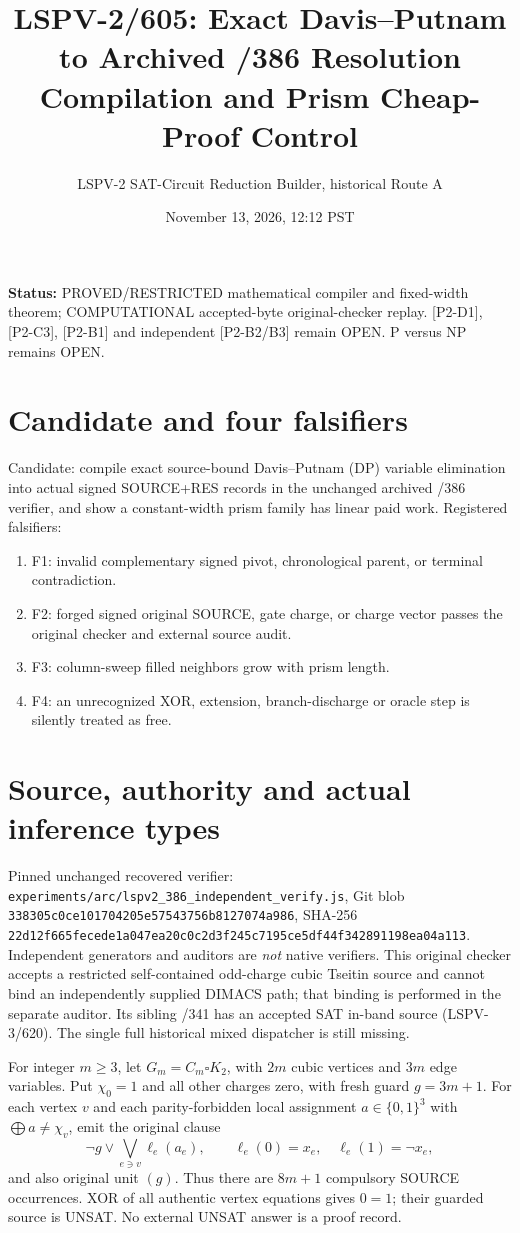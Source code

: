 \documentclass[11pt]{article}
\title{LSPV-2/605: Exact Davis--Putnam to Archived /386 Resolution Compilation and Prism Cheap-Proof Control}
\author{LSPV-2 SAT-Circuit Reduction Builder, historical Route A}
\date{November 13, 2026, 12:12 PST}
\begin{document}
\maketitle
\noindent\textbf{Status:} PROVED/RESTRICTED mathematical compiler and fixed-width theorem; COMPUTATIONAL accepted-byte original-checker replay. [P2-D1], [P2-C3], [P2-B1] and independent [P2-B2/B3] remain OPEN. P versus NP remains OPEN.

\section*{Candidate and four falsifiers}
Candidate: compile exact source-bound Davis--Putnam (DP) variable elimination into actual signed SOURCE+RES records in the unchanged archived /386 verifier, and show a constant-width prism family has linear paid work. Registered falsifiers:
\begin{enumerate}
\item[] F1: invalid complementary signed pivot, chronological parent, or terminal contradiction.
\item[] F2: forged signed original SOURCE, gate charge, or charge vector passes the original checker and external source audit.
\item[] F3: column-sweep filled neighbors grow with prism length.
\item[] F4: an unrecognized XOR, extension, branch-discharge or oracle step is silently treated as free.
\end{enumerate}

\section*{Source, authority and actual inference types}
Pinned unchanged recovered verifier: \texttt{experiments/arc/lspv2\_386\_independent\_verify.js}, Git blob \texttt{338305c0ce101704205e57543756b8127074a986}, SHA-256 \texttt{22d12f665fecede1a047ea20c0c2d3f245c7195ce5df44f342891198ea04a113}. Independent generators and auditors are \emph{not} native verifiers. This original checker accepts a restricted self-contained odd-charge cubic Tseitin source and cannot bind an independently supplied DIMACS path; that binding is performed in the separate auditor. Its sibling /341 has an accepted SAT in-band source (LSPV-3/620). The single full historical mixed dispatcher is still missing.

For integer $m\ge3$, let $G_m=C_m\square K_2$, with $2m$ cubic vertices and $3m$ edge variables. Put $\chi_0=1$ and all other charges zero, with fresh guard $g=3m+1$. For each vertex $v$ and each parity-forbidden local assignment $a\in\{0,1\}^3$ with $\bigoplus a\ne\chi_v$, emit the original clause
\[
 \neg g\vee\bigvee_{e\ni v}\ell_e(a_e),\qquad
 \ell_e(0)=x_e,\quad \ell_e(1)=\neg x_e,
\]
and also original unit $(g)$. Thus there are $8m+1$ compulsory SOURCE occurrences. XOR of all authentic vertex equations gives $0=1$; their guarded source is UNSAT. No external UNSAT answer is a proof record.
\end{document}

